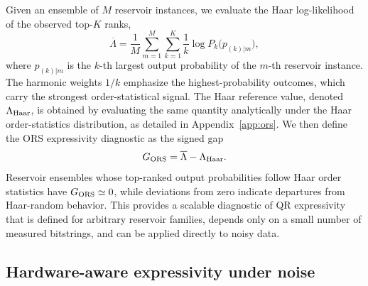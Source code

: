 \documentclass[
    aps,
    pre,
    amsmath,
    amssymb,
    reprint,
    superscriptaddress,
    preprintnumbers,
]{revtex4-2}
\begin{document}
Given an ensemble of $M$ reservoir instances, we evaluate the Haar log-likelihood of the observed top-$K$ ranks,
\begin{equation}
\overline{\Lambda}
= \frac{1}{M}\sum_{m=1}^{M}\sum_{k=1}^{K}
\frac{1}{k}\log P_k\bigl(p_{(k)|m}),
\label{eq:lambda-score}
\end{equation}
where $p_{(k)|m}$ is the $k$-th largest output probability of the $m$-th reservoir instance. The harmonic weights $1/k$ emphasize the highest-probability outcomes, which carry the strongest order-statistical signal. The Haar reference value, denoted $\Lambda_{\rm Haar}$, is obtained by evaluating the same quantity analytically under the Haar order-statistics distribution, as detailed in Appendix~\ref{app:ors}. We then define the ORS expressivity diagnostic as the signed gap
\begin{equation}
G_{\rm ORS} = \overline{\Lambda} - \Lambda_{\rm Haar}.
\label{eq:ors-gap}
\end{equation}
Reservoir ensembles whose top-ranked output probabilities follow Haar order statistics have $G_{\rm ORS}\simeq 0$, while deviations from zero indicate departures from Haar-random behavior. This provides a scalable diagnostic of QR expressivity that is defined for arbitrary reservoir families, depends only on a small number of measured bitstrings, and can be applied directly to noisy data.

\subsection{Hardware-aware expressivity under noise}
\label{sec:methods-noise}
\end{document}
